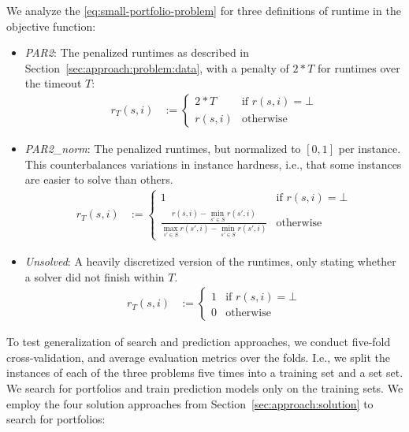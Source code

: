 \documentclass[conference]{IEEEtran}
\begin{document}
We analyze the \ref{eq:small-portfolio-problem} for three definitions of runtime in the objective function:

\begin{itemize}
	\item \emph{PAR2}:
	The penalized runtimes as described in Section~\ref{sec:approach:problem:data}, with a penalty of $2*T$ for runtimes over the timeout $T$:
	\begin{align*}
		r_T(s,i) &:= \begin{cases}
			2*T & \text{if }r(s,i) = \bot\\
			r(s,i) & \text{otherwise}
		\end{cases}
	\end{align*}
	\item \emph{PAR2\_norm}:
	The penalized runtimes, but normalized to $[0,1]$ per instance.
	This counterbalances variations in instance hardness, i.e., that some instances are easier to solve than others.
	\begin{align*}
		r_T(s,i) &:= \begin{cases}
			1 & \text{if }r(s,i) = \bot\\
			\frac{r(s,i) - \min_{s' \in S}{r(s',i)}}{\max_{s' \in S}{r(s',i)} - \min_{s' \in S}{r(s',i)}} & \text{otherwise}
		\end{cases}
	\end{align*}
	\item \emph{Unsolved}:
	A heavily discretized version of the runtimes, only stating whether a solver did not finish within $T$.
	\begin{align*}
		r_T(s,i) &:= \begin{cases}
			1 & \text{if }r(s,i) = \bot\\
			0 & \text{otherwise}
		\end{cases}
	\end{align*}
\end{itemize}

To test generalization of search and prediction approaches, we conduct five-fold cross-validation, and average evaluation metrics over the folds.
I.e., we split the instances of each of the three problems five times into a training set and a set set.
We search for portfolios and train prediction models only on the training sets.
We employ the four solution approaches from Section~\ref{sec:approach:solution} to search for portfolios:
\end{document}
